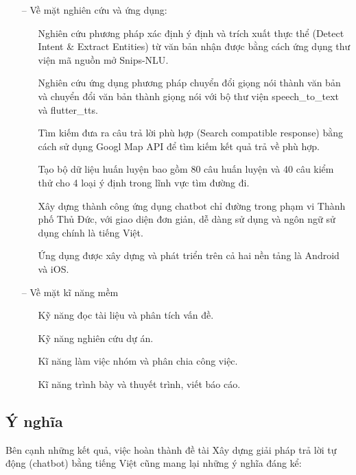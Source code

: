 \begin{itemize}
    \item[--] Về mặt nghiên cứu và ứng dụng:
        \begin{itemize}
            \item[\textbullet] Nghiên cứu phương pháp xác định ý định và trích xuất thực thể (Detect Intent \& Extract Entities) từ văn bản nhận được bằng cách ứng dụng thư viện mã nguồn mở Snips-NLU\cite{Snipsnlu}. 
            \item[\textbullet] Nghiên cứu ứng dụng phương pháp chuyển đổi giọng nói thành văn bản và chuyển đổi văn bản thành giọng nói với bộ thư viện speech\_to\_text\cite{stt} và flutter\_tts\cite{tts}.  
            \item[\textbullet] Tìm kiếm đưa ra câu trả lời phù hợp (Search compatible response) bằng cách sử dụng Googl Map API\cite{ggmaps} để tìm kiếm kết quả trả về phù hợp. 
            \item[\textbullet] Tạo bộ dữ liệu huấn luyện bao gồm 80 câu huấn luyện và 40 câu kiểm thử cho 4 loại ý định trong lĩnh vực tìm đường đi. 
            \item[\textbullet] Xây dựng thành công ứng dụng chatbot chỉ đường trong phạm vi Thành phố Thủ Đức, với giao diện đơn giản, dễ dàng sử dụng và ngôn ngữ sử dụng chính là tiếng Việt. 
            \item[\textbullet] Ứng dụng được xây dựng và phát triển trên cả hai nền tảng là Android và iOS.
        \end{itemize}
    \item[--] Về mặt kĩ năng mềm
        \begin{itemize}
            \item[\textbullet] Kỹ năng đọc tài liệu và phân tích vấn đề.
            \item[\textbullet] Kỹ năng nghiên cứu dự án.
            \item[\textbullet] Kĩ năng làm việc nhóm và phân chia công việc.
            \item[\textbullet] Kĩ năng trình bày và thuyết trình, viết báo cáo.
        \end{itemize}
\end{itemize}

\subsection{Ý nghĩa}
Bên cạnh những kết quả, việc hoàn thành đề tài Xây dựng giải pháp trả lời tự động (chatbot) bằng tiếng Việt cũng mang lại những ý nghĩa đáng kể:

